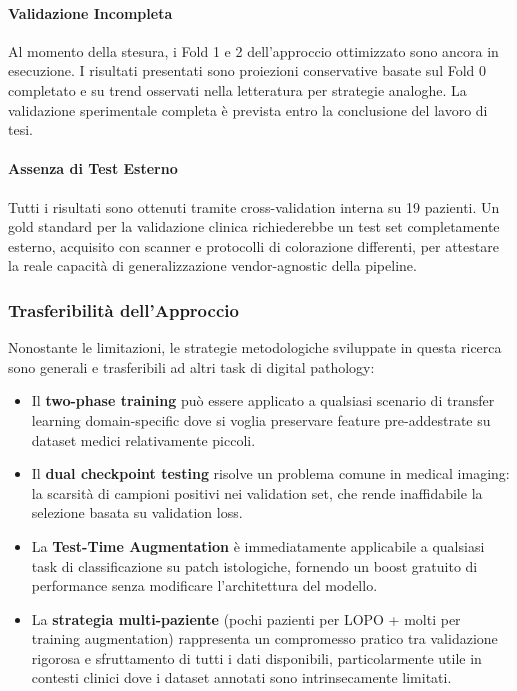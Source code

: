	\paragraph{Validazione Incompleta} Al momento della stesura, i Fold 1 e 2 dell'approccio ottimizzato sono ancora in esecuzione. I risultati presentati sono proiezioni conservative basate sul Fold 0 completato e su trend osservati nella letteratura per strategie analoghe. La validazione sperimentale completa è prevista entro la conclusione del lavoro di tesi.
	
	\paragraph{Assenza di Test Esterno} Tutti i risultati sono ottenuti tramite cross-validation interna su 19 pazienti. Un gold standard per la validazione clinica richiederebbe un test set completamente esterno, acquisito con scanner e protocolli di colorazione differenti, per attestare la reale capacità di generalizzazione vendor-agnostic della pipeline.
	
	\subsubsection{Trasferibilità dell'Approccio}
	
	Nonostante le limitazioni, le strategie metodologiche sviluppate in questa ricerca sono generali e trasferibili ad altri task di digital pathology:
	
	\begin{itemize}
		\item Il \textbf{two-phase training} può essere applicato a qualsiasi scenario di transfer learning domain-specific dove si voglia preservare feature pre-addestrate su dataset medici relativamente piccoli.
		
		\item Il \textbf{dual checkpoint testing} risolve un problema comune in medical imaging: la scarsità di campioni positivi nei validation set, che rende inaffidabile la selezione basata su validation loss.
		
		\item La \textbf{Test-Time Augmentation} è immediatamente applicabile a qualsiasi task di classificazione su patch istologiche, fornendo un boost gratuito di performance senza modificare l'architettura del modello.
		
		\item La \textbf{strategia multi-paziente} (pochi pazienti per LOPO + molti per training augmentation) rappresenta un compromesso pratico tra validazione rigorosa e sfruttamento di tutti i dati disponibili, particolarmente utile in contesti clinici dove i dataset annotati sono intrinsecamente limitati.
	\end{itemize}
	
